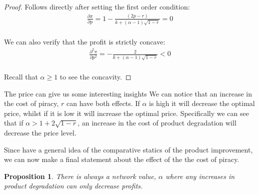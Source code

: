 \documentclass[12pt]{article}
\newtheorem{proposition}{Proposition}
\numberwithin{equation}{section}
\begin{document}
\begin{proof}
Follows directly after setting the first order condition:
\begin{align*} \label{FOC}
\frac{\partial \pi }{\partial p} = 1-\frac{ (2p-r)}{
k+ (\alpha-1)\sqrt{ 1 -r }} =0\\
\end{align*}

We can also verify that the profit is strictly concave: 
\begin{align*}
\frac{\partial^2 \pi }{\partial p^2}
= -\frac{ 2}{
k+ (\alpha-1)\sqrt{ 1 -r }} < 0 \\
\end{align*}

Recall that $\alpha \geq 1$ to see the concavity. 
\end{proof}

The price can give us some interesting insights We can notice that an increase in the cost of piracy, $r$ can have both effects. If $\alpha$ is high it will decrease the optimal price, whilst if it is low it will increase the optimal price.  Specifically we can see that if $\alpha> 1+2 \sqrt{1-r}$, an increase in the cost of product degradation will decrease the price level. 






Since have a general idea of the comparative statics of the product improvement, we can now make a final statement about the effect of the the cost of piracy. 

\begin{proposition}
There is always a network value, $\alpha$ where any increases in product degradation can only decrease profits.
\end{proposition}
\end{document}
